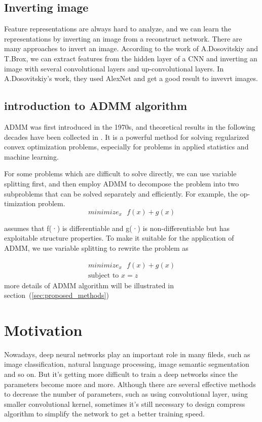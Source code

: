 \documentclass{acmtog} %
\begin{document}
\subsection{Inverting image}
Feature representations are always hard to analyze, and we can learn the representations by inverting an image from a reconstruct network. There are many approaches to invert an image. According to the work of A.Dosovitskiy and T.Brox, we can extract features from the hidden layer of a CNN and inverting an image with several convolutional layers and up-convolutional layers. In A.Dosovitskiy's work, they used AlexNet and get a good result to invevrt images.
\subsection{introduction to ADMM algorithm}

ADMM was first introduced in the 1970s, and theoretical results in the following decades have been collected in \cite{Background}. It is a powerful method for solving regularized convex optimization problems, especially for problems in applied statistics and machine learning. 

For some problems which are difficult to solve directly, we can use variable splitting first, and then employ ADMM to decompose the problem into two subproblems that can be solved separately and efficiently. For example, the op-timization problem.
\begin{equation}
  minimize_x\mbox{ }f(x) + g(x)
\end{equation}

assumes that f(·) is differentiable and g(·) is non-differentiable but has exploitable structure properties. To make it suitable for the application of ADMM, we use variable splitting to rewrite the problem as
	
\begin{eqnarray*}
  minimize_x\mbox{ }f(x) + g(x)\\
  \mbox{subject to }x = z
\end{eqnarray*}
more details of ADMM algorithm will be illustrated in section~(\ref{sec:proposed_methods})
\section{Motivation}

Nowadays, deep neural networks play an important role in many fileds, such as image classification, natural language processing, image semantic segmentation and so on. But it's getting more difficult to train a deep networks since the parameters become more and more. Although there are several effective methods to decrease the number of parameters, such as using convolutional layer, using smaller convolutional kernel, sometimes it's still necessary to design compress algorithm to simplify the network to get a better training speed.\\
\end{document}
